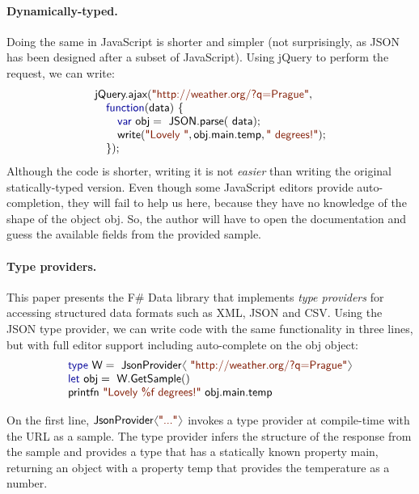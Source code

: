 \documentclass[preprint]{sigplanconf}
\newcommand{\langl}{\begin{picture}(4.5,7)
\put(1.1,2.5){\rotatebox{60}{\line(1,0){5.5}}}
\put(1.1,2.5){\rotatebox{300}{\line(1,0){5.5}}}
\end{picture}}
\newcommand{\rangl}{\begin{picture}(4.5,7)
\put(.9,2.5){\rotatebox{120}{\line(1,0){5.5}}}
\put(.9,2.5){\rotatebox{240}{\line(1,0){5.5}}}
\end{picture}}
\newcommand{\kvd}[1]{\textnormal{\textcolor{kvdclr}{\sffamily #1}}}
\newcommand{\str}[1]{\textnormal{\textcolor{strclr}{\sffamily "#1"}}}
\newcommand{\ident}[1]{\textnormal{\sffamily #1}}
\begin{document}
\paragraph{Dynamically-typed.}
Doing the same in JavaScript is shorter and simpler (not surprisingly, as JSON has been designed
after a subset of JavaScript). Using jQuery to perform the request, we can write:
%
\begin{equation*}
\begin{array}{l}
\ident{jQuery.ajax}(\str{http://weather.org/?q=Prague}, \\
\quad \kvd{function}(\ident{data})~\{ \\
\qquad \kvd{var}~\ident{obj} = \ident{JSON.parse}(\ident{data}); \\
\qquad \ident{write}(\str{Lovely }, \ident{obj.main.temp}, \str{ degrees!}); \\
\quad \});
\end{array}
\end{equation*}
%
Although the code is shorter, writing it is not \emph{easier} than writing the original
statically-typed version. Even though some JavaScript editors provide auto-completion, they
will fail to help us here, because they have no knowledge of the shape of the object \ident{obj}.
So, the author will have to open the documentation and guess the available fields from the
provided sample.

\paragraph{Type providers.}
This paper presents the F\# Data library that implements \emph{type providers} for accessing
structured  data formats such as XML, JSON and CSV. Using the JSON type provider, we can write code
with the same functionality in three lines, but with full editor support including auto-complete
on the \ident{obj} object:
%
\begin{equation*}
\begin{array}{l}
 \kvd{type}~\ident{W} = \ident{JsonProvider}\langl\str{http://weather.org/?q=Prague}\rangl \\
 \kvd{let}~\ident{obj} = \ident{W.GetSample}() \\
 \ident{printfn}~\str{Lovely \%f degrees!}~\ident{obj.main.temp}
\end{array}
\end{equation*}
\vspace{0.0em}

\noindent
On the first line, $\ident{JsonProvider}\langl\str{...}\rangl$ invokes a type provider at
compile-time with the URL as a sample. The type provider infers the structure of the response
from the sample and provides a type that has a statically known property \ident{main}, returning
an object with a property \ident{temp} that provides the temperature as a number.
\end{document}
